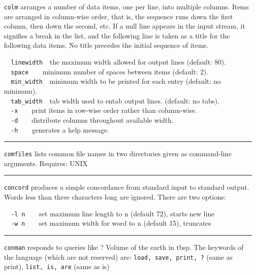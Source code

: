 {\texttt{colm} arranges a number of data items, one per line, into
multiple columns. Items are arranged in column-wise order, that is, the
sequence runs down the first column, then down the second, etc. If a
null line appears in the input stream, it signifies a break in the
list, and the following line is taken as a title for the following data
items. No title precedes the initial sequence of items.

\texttt{\ \ linewidth\ \ }the maximum width allowed for output lines
(default: 80).\\
\ \ \texttt{space\ \ \ \ }minimum number of spaces between items
(default: 2).\\
\ \ \texttt{min\_width\ \ }minimum width to be printed for each entry
(default: no minimum).\\
\ \ \texttt{tab\_width}\texttt{\ \ }tab width used to entab output
lines. (default: no tabs).\\
\ \ \texttt{{}-x}\ \ \ \ print items in row-wise order rather than
column-wise.\\
\ \ \texttt{{}-d}\ \ \ \ distribute columns throughout available
width.\\
\ \ \texttt{{}-h}\texttt{\ \ \ \ }generates a help message.

\vspace{0.25cm}\hrule{}

\texttt{comfiles} lists common file names in two directories given as
command-line arguments. Requires: UNIX 

\vspace{0.25cm}\hrule{}

\texttt{concord} produces a simple concordance from standard input to
standard output. Words less than three characters long are ignored.
There are two options:

\texttt{\ \ }\texttt{{}-l n}\texttt{\ \ }\ \ set maximum line length to
n (default 72), starts new line\\
\ \ \texttt{{}-w n}\texttt{\ \ }\ \ set maximum width for word to n
(default 15), truncates

\vspace{0.25cm}\hrule{}

\texttt{conman} responds to queries like {\textquotedbl}? Volume of the
earth in tbsp{\textquotedbl}. The keywords of the language (which are
not reserved) are: \texttt{load, save, print, ?} (same as print),
\texttt{list, is, are} (same as is)

}
